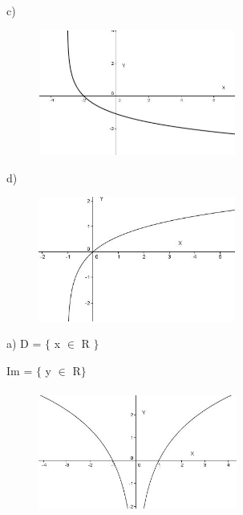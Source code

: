 \begin{respostas}{7}
c)\begin{figure}[H]
	\begin{Center}
		\includegraphics[width=2.56in,height=1.62in]{capitulos/logaritmos_e_funcao_logaritmica/media/image32.JPG}
	\end{Center}
\end{figure}

d)\begin{figure}[H]
	\begin{Center}
		\includegraphics[width=2.55in,height=1.61in]{capitulos/logaritmos_e_funcao_logaritmica/media/image33.JPG}
	\end{Center}
\end{figure}

\ansitem{} 

a)
D = $ \{ $  x $ \in $ R $ \} $ 

Im = $ \{ $  y $ \in $ R$ \} $ 

\begin{figure}[H]
	\begin{Center}
		\includegraphics[width=2.57in,height=1.6in]{capitulos/logaritmos_e_funcao_logaritmica/media/image34.JPG}
	\end{Center}
\end{figure}


\end{respostas}
